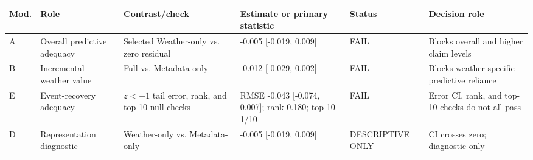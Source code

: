 \begin{tabular}{p{}p{}p{}p{}p{}p{}}
\toprule
Mod. & Role & Contrast/check & Estimate or primary statistic & Status & Decision role \\
\midrule
A & Overall predictive adequacy & Selected Weather-only vs. zero residual & -0.005 [-0.019, 0.009] & FAIL & Blocks overall and higher claim levels \\
B & Incremental weather value & Full vs. Metadata-only & -0.012 [-0.029, 0.002] & FAIL & Blocks weather-specific predictive reliance \\
E & Event-recovery adequacy & $z<-1$ tail error, rank, and top-10 null checks & RMSE -0.043 [-0.074, 0.007]; rank 0.180; top-10 1/10 & FAIL & Error CI, rank, and top-10 checks do not all pass \\
D & Representation diagnostic & Weather-only vs. Metadata-only & -0.005 [-0.019, 0.009] & DESCRIPTIVE ONLY & CI crosses zero; diagnostic only \\
\bottomrule
\end{tabular}
